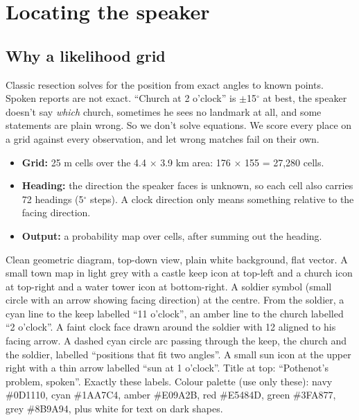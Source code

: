 \chapter{Locating the speaker}\label{ch:loc}

\section{Why a likelihood grid}

Classic resection solves for the position from exact angles to known points. Spoken reports are not
exact. ``Church at 2 o'clock'' is $\pm$15$^\circ$ at best, the speaker doesn't say \emph{which}
church, sometimes he sees no landmark at all, and some statements are plain wrong. So we don't solve
equations. We score every place on a grid against every observation, and let wrong matches fail on
their own.

\begin{itemize}
  \item \textbf{Grid:} 25 m cells over the 4.4 $\times$ 3.9 km area: 176 $\times$ 155 = 27,280 cells.
  \item \textbf{Heading:} the direction the speaker faces is unknown, so each cell also carries
        72 headings (5$^\circ$ steps). A clock direction only means something relative to the facing
        direction.
  \item \textbf{Output:} a probability map over cells, after summing out the heading.
\end{itemize}

{Clean geometric diagram, top-down view, plain white background, flat vector. A small town map in light grey with a
castle keep icon at top-left and a church icon at top-right and a water tower icon at bottom-right. A soldier
symbol (small circle with an arrow showing facing direction) at the centre. From the soldier, a cyan line to the
keep labelled ``11 o'clock'', an amber line to the church labelled ``2 o'clock''. A faint clock face drawn around
the soldier with 12 aligned to his facing arrow. A dashed cyan circle arc passing through the keep, the church and
the soldier, labelled ``positions that fit two angles''. A small sun icon at the upper right with a thin arrow labelled
``sun at 1 o'clock''. Title at top: ``Pothenot's problem, spoken''. Exactly these labels. Colour palette (use only these): navy \#0D1110, cyan \#1AA7C4, amber \#E09A2B, red \#E5484D, green \#3FA877, grey \#8B9A94, plus white for text on dark shapes.}

